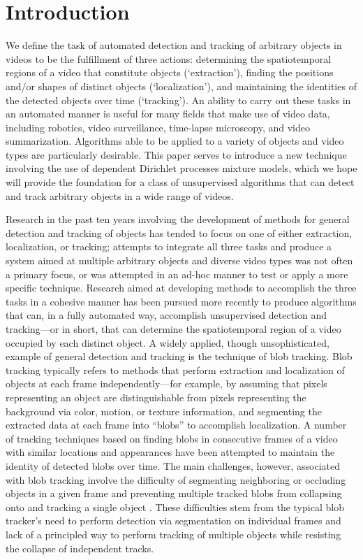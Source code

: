 \documentclass[smallcondensed, final]{svjour3}
\begin{document}

\section{Introduction}

We define the task of automated detection and tracking of arbitrary objects in videos to be the fulfillment of three actions: determining the spatiotemporal regions of a video that constitute objects (`extraction'), finding the positions and/or shapes of distinct objects (`localization'), and maintaining the identities of the detected objects over time (`tracking'). An ability to carry out these tasks in an automated manner is useful for many fields that make use of video data, including robotics, video surveillance, time-lapse microscopy, and video summarization. Algorithms able to be applied to a variety of objects and video types are particularly desirable. This paper serves to introduce a new technique involving the use of dependent Dirichlet processes mixture models, which we hope will provide the foundation for a class of unsupervised algorithms that can detect and track arbitrary objects in a wide range of videos.

Research in the past ten years involving the development of methods for general detection and tracking of objects has tended to focus on one of either extraction, localization, or tracking; attempts to integrate all three tasks and produce a system aimed at multiple arbitrary objects and diverse video types was not often a primary focus, or was attempted in an ad-hoc manner to test or apply a more specific technique. Research aimed at developing methods to accomplish the three tasks in a cohesive manner has been pursued more recently to produce algorithms that can, in a fully automated way, accomplish unsupervised detection and tracking---or in short, that can determine the spatiotemporal region of a video occupied by each distinct object. A widely applied, though unsophisticated, example of general detection and tracking is the technique of blob tracking. Blob tracking typically refers to methods that perform extraction and localization of objects at each frame independently---for example, by assuming that pixels representing an object are distinguishable from pixels representing the background via color, motion, or texture information, and segmenting the extracted data at each frame into ``blobs'' to accomplish localization. A number of tracking techniques based on finding blobs in consecutive frames of a video with similar locations and appearances have been attempted to maintain the identity of detected blobs over time. The main challenges, however, associated with blob tracking involve the difficulty of segmenting neighboring or occluding objects in a given frame \cite{zhao2004tracking} and preventing multiple tracked blobs from collapsing onto and tracking a single object \cite{vermaak_2003}. These difficulties stem from the typical blob tracker's need to perform detection via segmentation on individual frames and lack of a principled way to perform tracking of multiple objects while resisting the collapse of independent tracks.
\end{document}
